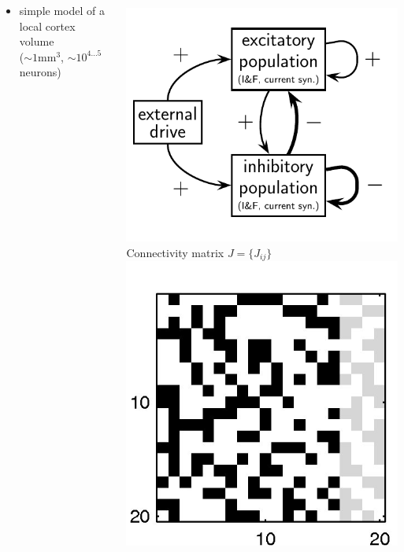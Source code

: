 \documentclass[8pt,t,usepdftitle=false]{beamer}
\begin{document}
\begin{frame}[t,plain]
  \frametitle{\ttl}
  \begin{columns}
    \centering
    \parbox{\linewidth}{\footnotesize
      \begin{itemize}
      \item[] simple model of a local cortex volume {\tiny\parencite{Brunel00_183}}\\
      ($\sim{}1\text{mm}^3$, $\sim{}10^{4\ldots{}5}$ neurons)
      \end{itemize}
    }\\
    \includegraphics[width=0.8\linewidth]{figures/brunel}
    \centering
    \hspace{4ex}Connectivity matrix $J=\{J_{ij}\}$\\
    \includegraphics[width=0.6\linewidth]{figures/dalemat}\\

\end{columns}
\end{frame}
\end{document}
